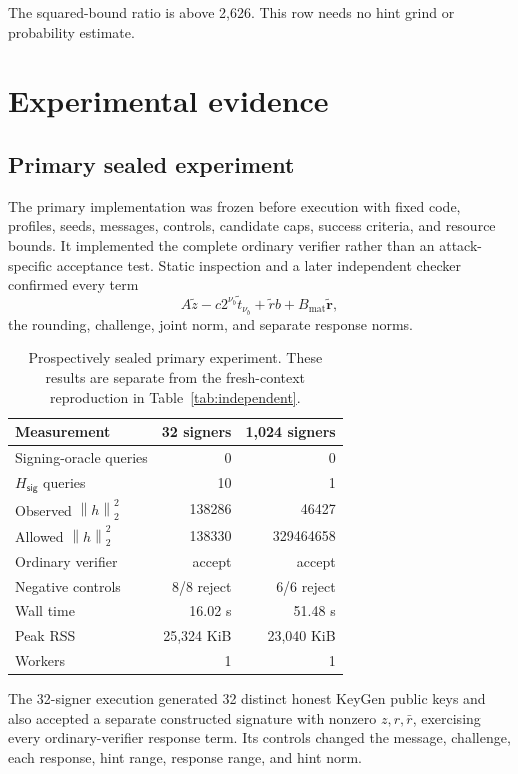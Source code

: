 \documentclass[10pt,a4paper]{article}
\newcommand{\norm}[1]{\left\lVert #1\right\rVert_2}
\newcommand{\Hsig}{H_{\mathsf{sig}}}
\begin{document}
The squared-bound ratio is above 2,626. This row needs no hint grind or
probability estimate.

\section{Experimental evidence}
\label{sec:evidence}

\subsection{Primary sealed experiment}

The primary implementation was frozen before execution with fixed code,
profiles, seeds, messages, controls, candidate caps, success criteria, and
resource bounds. It implemented the complete ordinary verifier rather than an
attack-specific acceptance test. Static inspection and a later independent
checker confirmed every term
\[
  A\widetilde z-c2^{\nu_b}\widetilde t_{\nu_b}
  +\widetilde r b+B_{\mathrm{mat}}\widetilde{\boldsymbol r},
\]
the rounding, challenge, joint norm, and separate response norms.

\begin{table}[ht]
\centering
\small
\begin{tabular}{@{}lrr@{}}
\toprule
Measurement & 32 signers & 1,024 signers \\
\midrule
Signing-oracle queries & 0 & 0 \\
$\Hsig$ queries & 10 & 1 \\
Observed $\norm{h}^2$ & 138286 & 46427 \\
Allowed $\norm{h}^2$ & 138330 & 329464658 \\
Ordinary verifier & accept & accept \\
Negative controls & 8/8 reject & 6/6 reject \\
Wall time & 16.02 s & 51.48 s \\
Peak RSS & 25,324 KiB & 23,040 KiB \\
Workers & 1 & 1 \\
\bottomrule
\end{tabular}
\caption{Prospectively sealed primary experiment. These results are separate
from the fresh-context reproduction in Table~\ref{tab:independent}.}
\label{tab:primary}
\end{table}

The 32-signer execution generated 32 distinct honest KeyGen public keys and
also accepted a separate constructed signature with nonzero $z,r,\bar r$,
exercising every ordinary-verifier response term. Its controls changed the
message, challenge, each response, hint range, response range, and hint norm.
\end{document}
